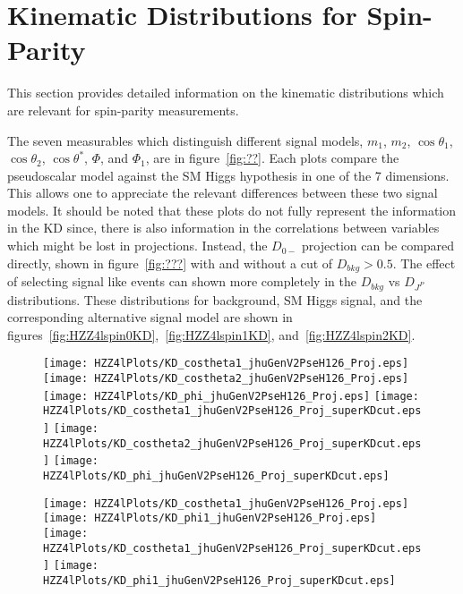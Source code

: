 \appendix 
{}

\chapter{Kinematic Distributions for Spin-Parity}

This section provides detailed information on the kinematic
distributions which are relevant for spin-parity measurements.

The seven measurables which distinguish different signal models,
$m_1$, $m_2$, $\cos\theta_1$, $\cos\theta_2$, $\cos\theta^*$, 
$\Phi$, and $\Phi_1$, are in figure~\ref{fig:??}.  Each plots
compare the pseudoscalar model against 
the SM Higgs hypothesis in one of the 7 dimensions.  This allows 
one to appreciate the relevant differences between these 
two signal models.  It should be noted that these plots do not
fully represent the information in the KD since, there is 
also information in the correlations between variables which 
might be lost in projections. Instead, the $D_{0-}$ projection
can be compared directly, shown in figure~\ref{fig:???} with 
and without a cut of $D_{bkg}>0.5$.  The effect of selecting 
signal like events can shown more completely in the $D_{bkg}$ 
vs $D_{J^P}$ distributions.  These distributions for background, 
SM Higgs signal, and the corresponding alternative signal model
are shown in 
figures~\ref{fig:HZZ4lspin0KD},~\ref{fig:HZZ4lspin1KD}, 
and~\ref{fig:HZZ4lspin2KD}.

\begin{figure}
\begin{center}
\texttt{[image: HZZ4lPlots/KD\_costheta1\_jhuGenV2PseH126\_Proj.eps]}
\texttt{[image: HZZ4lPlots/KD\_costheta2\_jhuGenV2PseH126\_Proj.eps]}
\texttt{[image: HZZ4lPlots/KD\_phi\_jhuGenV2PseH126\_Proj.eps]}
\texttt{[image: HZZ4lPlots/KD\_costheta1\_jhuGenV2PseH126\_Proj\_superKDcut.eps]}
\texttt{[image: HZZ4lPlots/KD\_costheta2\_jhuGenV2PseH126\_Proj\_superKDcut.eps]}
\texttt{[image: HZZ4lPlots/KD\_phi\_jhuGenV2PseH126\_Proj\_superKDcut.eps]}
\label{fig:HZZ4lhelicityanglesKD}
\caption{}
\end{center}
\end{figure}

\begin{figure}
\begin{center}
\texttt{[image: HZZ4lPlots/KD\_costheta1\_jhuGenV2PseH126\_Proj.eps]}
\texttt{[image: HZZ4lPlots/KD\_phi1\_jhuGenV2PseH126\_Proj.eps]}\\
\texttt{[image: HZZ4lPlots/KD\_costheta1\_jhuGenV2PseH126\_Proj\_superKDcut.eps]}
\texttt{[image: HZZ4lPlots/KD\_phi1\_jhuGenV2PseH126\_Proj\_superKDcut.eps]}
\label{fig:HZZ4lprodanglesKD}
\caption{}
\end{center}
\end{figure}

